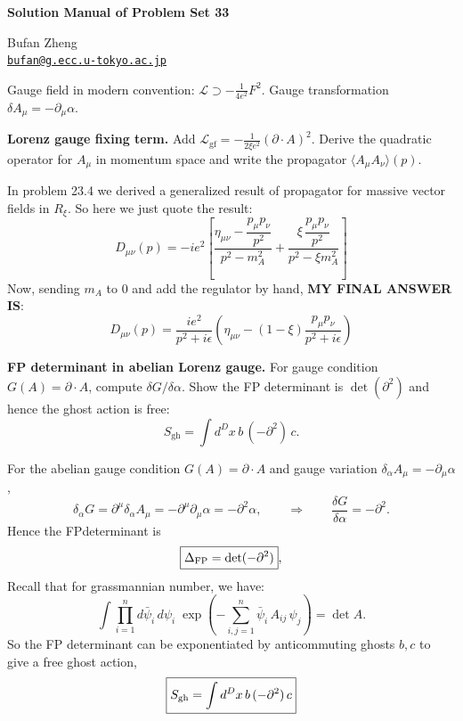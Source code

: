 \resetproblem
\begin{center}
    {\LARGE \textbf{Solution Manual of Problem Set 33} \par}
    \vspace{1em}
    {\large Bufan Zheng\\ \href{mailto:bufan@g.ecc.u-tokyo.ac.jp}{\texttt{bufan@g.ecc.u-tokyo.ac.jp}} \par}
\end{center}

\noindent Gauge field in modern convention: \(\mathcal{L}\supset-\frac{1}{4e^2}F^2\). Gauge transformation \(\delta A_\mu=-\partial_\mu\alpha\).

\begin{problem}
    \textbf{Lorenz gauge fixing term.} Add \(\mathcal{L}_{\text{gf}}=-\frac{1}{2\xi e^2}(\partial\cdot A)^2\). Derive the quadratic operator for \(A_\mu\) in momentum space and write the propagator \(\langle A_\mu A_\nu\rangle(p)\).
\end{problem}
\begin{solution}[33.1]
	In problem 23.4 we derived a generalized result of propagator for massive vector fields in $R_\xi$. So here we just quote the result:
	\[
	D_{\mu\nu}(p)=- i e^2\left[\frac{\eta_{\mu\nu}-\dfrac{p_\mu p_\nu}{p^2}}{p^2-m_A^2}
	+\frac{\xi\,\dfrac{p_\mu p_\nu}{p^2}}{p^2-\xi m_A^2}\right]
	\]
	Now, sending $m_A$ to $0$ and add the regulator by hand, \textbf{MY FINAL ANSWER IS}:
	\[
	\boxed{
		D_{\mu\nu}(p)=\frac{i e^2}{p^2+i\epsilon}\left(\eta_{\mu\nu}-(1-\xi)\frac{p_\mu p_\nu}{p^2+i\epsilon}\right)
	}
	\]
\end{solution}
\begin{problem}
    \textbf{FP determinant in abelian Lorenz gauge.} For gauge condition \(G(A)=\partial\cdot A\), compute \(\delta G/\delta\alpha\). Show the FP determinant is \(\det(\partial^2)\) and hence the ghost action is free:
    \[
        S_{\text{gh}}=\int d^Dx\, b\,(-\partial^2)\,c.
    \]
\end{problem}
\begin{solution}[33.2]
	For the abelian gauge condition \(G(A)=\partial\cdot A\) and gauge variation \(\delta_\alpha A_\mu=-\partial_\mu\alpha\),
	\[
	\delta_\alpha G=\partial^\mu\delta_\alpha A_\mu=-\partial^\mu\partial_\mu\alpha=-\partial^2\alpha,
	\qquad\Rightarrow\qquad
	\frac{\delta G}{\delta\alpha}=-\partial^2.
	\]
	Hence the FPdeterminant is
	\[
	\boxed{
	\Delta_{\rm FP}=\det(-\partial^2)
},
	\]
	Recall that for grassmannian number, we have:
\[
\int \prod_{i=1}^n d\bar\psi_i\, d\psi_i\;
\exp\!\left(-\sum_{i,j=1}^n \bar\psi_i\,A_{ij}\,\psi_j\right)
=\det A.
\]
	So the FP
	determinant can be exponentiated by anticommuting ghosts \(b,c\) to give a free ghost action,
	\[
	\boxed{
	S_{\rm gh}=\int d^D x\, b\,(-\partial^2)\,c}
	\]
\end{solution}
